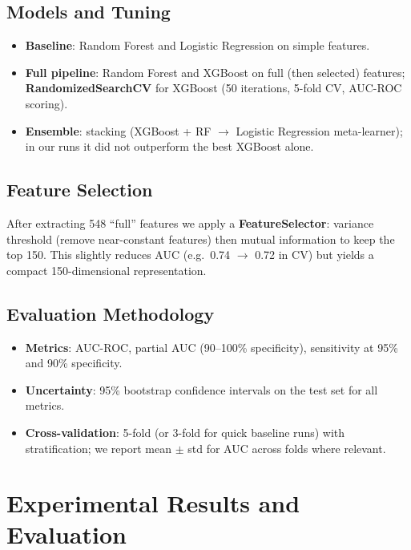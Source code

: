 \documentclass[11pt,a4paper]{article}
\begin{document}
\subsection{Models and Tuning}

\begin{itemize}
  \item \textbf{Baseline}: Random Forest and Logistic Regression on simple features.
  \item \textbf{Full pipeline}: Random Forest and XGBoost on full (then selected) features; \textbf{RandomizedSearchCV} for XGBoost (50 iterations, 5-fold CV, AUC-ROC scoring).
  \item \textbf{Ensemble}: stacking (XGBoost + RF $\to$ Logistic Regression meta-learner); in our runs it did not outperform the best XGBoost alone.
\end{itemize}

\subsection{Feature Selection}

After extracting 548 ``full'' features we apply a \textbf{FeatureSelector}: variance threshold (remove near-constant features) then mutual information to keep the top 150. This slightly reduces AUC (e.g.\ 0.74 $\to$ 0.72 in CV) but yields a compact 150-dimensional representation.

\subsection{Evaluation Methodology}

\begin{itemize}
  \item \textbf{Metrics}: AUC-ROC, partial AUC (90--100\% specificity), sensitivity at 95\% and 90\% specificity.
  \item \textbf{Uncertainty}: 95\% bootstrap confidence intervals on the test set for all metrics.
  \item \textbf{Cross-validation}: 5-fold (or 3-fold for quick baseline runs) with stratification; we report mean $\pm$ std for AUC across folds where relevant.
\end{itemize}

\section{Experimental Results and Evaluation}
\end{document}
